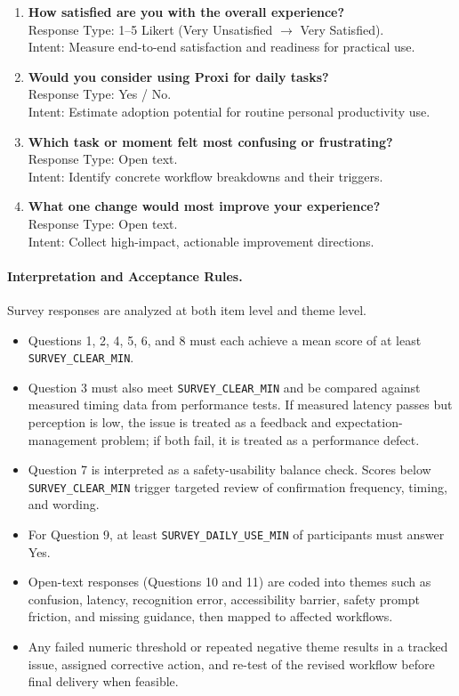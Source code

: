 \documentclass[12pt, titlepage]{article}
\begin{document}
\begin{enumerate}
\item \textbf{How satisfied are you with the overall experience?}\\
Response Type: 1--5 Likert (Very Unsatisfied $\rightarrow$ Very Satisfied).\\
Intent: Measure end-to-end satisfaction and readiness for practical use.

\item \textbf{Would you consider using Proxi for daily tasks?}\\
Response Type: Yes / No.\\
Intent: Estimate adoption potential for routine personal productivity use.

\item \textbf{Which task or moment felt most confusing or frustrating?}\\
Response Type: Open text.\\
Intent: Identify concrete workflow breakdowns and their triggers.

\item \textbf{What one change would most improve your experience?}\\
Response Type: Open text.\\
Intent: Collect high-impact, actionable improvement directions.

\end{enumerate}

\paragraph{Interpretation and Acceptance Rules.}
Survey responses are analyzed at both item level and theme level.

\begin{itemize}
  \item Questions 1, 2, 4, 5, 6, and 8 must each achieve a mean score of at
  least \texttt{SURVEY\_CLEAR\_MIN}.
  \item Question 3 must also meet \texttt{SURVEY\_CLEAR\_MIN} and be
  compared against measured timing data from performance tests. If
  measured latency passes but perception is low, the issue is treated as
  a feedback and expectation-management problem; if both fail, it is
  treated as a performance defect.
  \item Question 7 is interpreted as a safety-usability balance check.
  Scores below \texttt{SURVEY\_CLEAR\_MIN} trigger targeted review of
  confirmation frequency, timing, and wording.
  \item For Question 9, at least \texttt{SURVEY\_DAILY\_USE\_MIN} of
  participants must answer Yes.
  \item Open-text responses (Questions 10 and 11) are coded into themes
  such as confusion, latency, recognition error, accessibility barrier,
  safety prompt friction, and missing guidance, then mapped to affected
  workflows.
  \item Any failed numeric threshold or repeated negative theme results
  in a tracked issue, assigned corrective action, and re-test of the
  revised workflow before final delivery when feasible.
\end{itemize}
\end{document}
